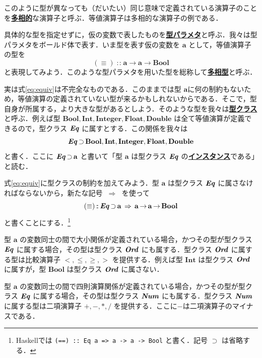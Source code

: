 \documentclass[a5paper,twoside,fleqn,draft]{jsbook}
\newcommand{\programminglanguage}[1]{\textsf{#1}}
\newcommand{\haskell}{\programminglanguage{Haskell}}
\newcommand{\keyword}[1]{{\underline{\textbf{#1}}}}
\newcommand{\code}[1]{\texttt{#1}}
\DeclareMathOperator{\mSuperClass}{\;\Rightarrow\;}
\DeclareMathOperator{\mSuperSet}{\supset}
\DeclareMathOperator{\mFuncArrow}{\rightarrow}
\DeclareMathOperator{\mIn}{{:\!:}}
\newcommand{\mType}[1]{\mathbf{#1}} %
\newcommand{\mA}{\mType{a}}
\newcommand{\mBoolType}{\mType{Bool}}
\newcommand{\mFloatType}{\mType{Float}}
\newcommand{\mDoubleType}{\mType{Double}}
\newcommand{\mIntType}{\mType{Int}}
\newcommand{\mIntegerType}{\mType{Integer}}
\newcommand{\mTypeClass}[1]{\textbf{\textit{#1}}}
\newcommand{\mEqTypeClass}{\mTypeClass{Eq}}
\newcommand{\mNumTypeClass}{\mTypeClass{Num}}
\newcommand{\mOrdTypeClass}{\mTypeClass{Ord}}
\begin{document}
このように型が異なっても（だいたい）同じ意味で定義されている演算子のことを\keyword{多相的}な演算子と呼ぶ．等値演算子は多相的な演算子の例である．

具体的な型を指定せずに，仮の変数で表したものを\keyword{型パラメタ}と呼ぶ．我々は型パラメタをボールド体で表す．いま型を表す仮の変数を $\mA $ として，等値演算子の型を
\begin{equation}
  \label{eq:equiv}
  (\equiv)
  \mIn\mA\mFuncArrow\mA\mFuncArrow\mBoolType
\end{equation}
と表現してみよう．このような型パラメタを用いた型を総称して\keyword{多相型}と呼ぶ．

実は式\eqref{eq:equiv}は不完全なものである．このままでは型 $\mA $に何の制約もないため，等値演算の定義されていない型が来るかもしれないからである．そこで，型自身が所属する，より大きな型があるとしよう．そのような型を我々は\keyword{型クラス}と呼ぶ．例えば型 $\mBoolType,\mIntType,\mIntegerType,\mFloatType,\mDoubleType$ は全て等値演算が定義できるので，型クラス $\mEqTypeClass$ に属すとする．この関係を我々は
\begin{equation}
  \mEqTypeClass
  \mSuperSet\mBoolType,\mIntType,\mIntegerType,\mFloatType,\mDoubleType
\end{equation}
と書く．ここに $\mEqTypeClass\mSuperSet\mA$ と書いて「型 $\mA$ は型クラス $\mEqTypeClass$ の\keyword{インスタンス}である」と読む．

式\eqref{eq:equiv}に型クラスの制約を加えてみよう．型 $\mA$ は型クラス $\mEqTypeClass$ に属さなければならないから，新たな記号 $\mSuperClass$ を使って
\begin{equation}
  (\equiv)
  \mIn{}\mEqTypeClass\mSuperSet\mA
  \mSuperClass\mA\mFuncArrow\mA\mFuncArrow\mBoolType
\end{equation}
と書くことにする．\footnote{\haskell では \code{(==) :: Eq a => a -> a -> Bool} と書く．記号 $\mSuperSet$ は省略する．}

型 $\mA$ の変数同士の間で大小関係が定義されている場合，かつその型が型クラス $\mEqTypeClass$ に属する場合，その型は型クラス $\mOrdTypeClass$ にも属する．型クラス $\mOrdTypeClass$ に属する型は比較演算子 $<,\le,\ge,>$ を提供する．例えば型 $\mIntType$ は型クラス $\mOrdTypeClass$ に属すが，型 $\mBoolType$ は型クラス $\mOrdTypeClass$ に属さない．

型 $\mA$ の変数同士の間で四則演算関係が定義されている場合，かつその型が型クラス $\mEqTypeClass$ に属する場合，その型は型クラス $\mNumTypeClass$ にも属する．型クラス $\mNumTypeClass$ に属する型は二項演算子 $+,-,*,/$ を提供する．ここに$-$は二項演算子のマイナスである．
\end{document}
